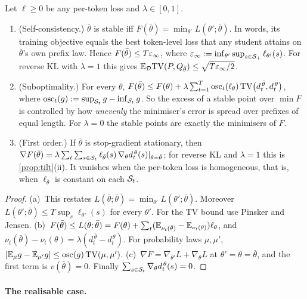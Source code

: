 \begin{proposition}\label{prop:stable}
\Pv Let $\ell\ge0$ be any per-token loss and $\lambda\in[0,1]$.
\begin{enumerate}[label=(\alph*),nosep]
\item (Self-consistency.) $\bar\theta$ is stable iff $F(\bar\theta)=\min_{\theta'}L(\theta';\bar\theta)$. In words, its training objective equals the best
token-level loss that any student attains on $\bar\theta$'s own prefix law. Hence $F(\bar\theta)\le T\varepsilon_\infty$, where
$\varepsilon_\infty:=\inf_{\theta'}\sup_{s\in\mathcal{S}_+}\ell_{\theta'}(s)$. For reverse KL with $\lambda=1$ this gives $\mathbb{E}_{\mathcal{D}}\mathrm{TV}(P,Q_{\bar\theta})\le\sqrt{T\varepsilon_\infty/2}$.
\item (Suboptimality.) For every $\theta$,
$F(\bar\theta)\le F(\theta)+\lambda\sum_{t=1}^T\mathrm{osc}_t(\ell_\theta)\,\mathrm{TV}\big(d^{\,\bar\theta}_t,d^{\,\theta}_t\big)$, where $\mathrm{osc}_t(g):=\sup_{\mathcal{S}_t}g-\inf_{\mathcal{S}_t}g$. So the
excess of a stable point over $\min F$ is controlled by how \emph{unevenly} the minimiser's error is spread over
prefixes of equal length. For $\lambda=0$ the stable points are exactly the minimisers of $F$.
\item (First order.) If $\bar\theta$ is stop-gradient stationary, then
$\nabla F(\bar\theta)=\lambda\sum_t\sum_{s\in\mathcal{S}_t}\ell_{\bar\theta}(s)\,\nabla_\theta d^{\,\theta}_t(s)|_{\theta=\bar\theta}$; for reverse KL and $\lambda=1$ this is
\cref{prop:tilt}(ii). It vanishes when the per-token loss is homogeneous, that is, when $\ell_{\bar\theta}$ is constant on each $\mathcal{S}_t$.
\end{enumerate}
\end{proposition}
\begin{proof}
(a)~This restates $L(\bar\theta;\bar\theta)=\min_{\theta'}L(\theta';\bar\theta)$. Moreover $L(\theta';\bar\theta)\le T\sup_s\ell_{\theta'}(s)$ for every $\theta'$. For the TV bound
use Pinsker and Jensen. (b)~$F(\bar\theta)\le L(\theta;\bar\theta)=F(\theta)+\sum_t(\mathbb{E}_{\nu_t(\bar\theta)}-\mathbb{E}_{\nu_t(\theta)})\ell_\theta$, and
$\nu_t(\bar\theta)-\nu_t(\theta)=\lambda(d^{\,\bar\theta}_t-d^{\,\theta}_t)$. For probability laws $\mu,\mu'$, $|\mathbb{E}_\mu g-\mathbb{E}_{\mu'}g|\le\mathrm{osc}(g)\,\mathrm{TV}(\mu,\mu')$.
(c)~$\nabla F=\nabla_{\theta'}L+\nabla_\theta L$ at $\theta'=\theta=\bar\theta$, and the first term is $v(\bar\theta)=0$. Finally
$\sum_{s\in\mathcal{S}_t}\nabla_\theta d^{\,\theta}_t(s)=0$.
\end{proof}

\paragraph{The realisable case.}

